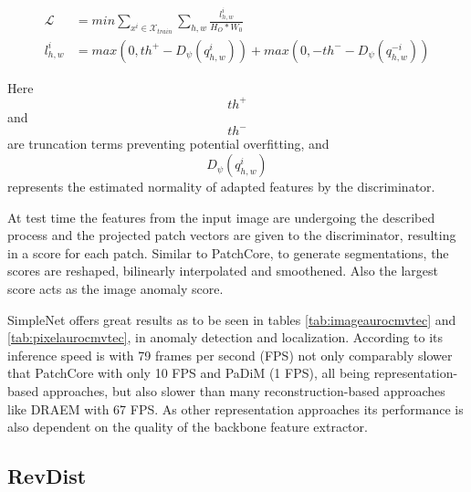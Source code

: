 \begin{equation}
    \label{eq:simplenetloss}
    \begin{split}
        \mathcal{L} &= min \sum_{x^{i}\in \mathcal{X}_{train}} \sum_{h, w} \frac{l^{i}_{h,w}}{H_{O} * W_{0}} \\
        l^{i}_{h,w} &= max(0, th^{+} - D_{\psi}(q^{i}_{h,w})) + max(0, -th^{-} - D_{\psi}(q^{-i}_{h,w}))
    \end{split}
\end{equation}    

Here $$th^{+}$$ and $$th^{-}$$ are truncation terms preventing potential overfitting, and $$D_{\psi}(q^{i}_{h,w})$$ represents the estimated normality of adapted features by the discriminator.

At test time the features from the input image are undergoing the described process and the projected patch vectors are given to the discriminator, resulting in a score for each patch. Similar to 
PatchCore, to generate segmentations, the scores are reshaped, bilinearly interpolated and smoothened. Also the largest score acts as the image anomaly score.

SimpleNet offers great results as to be seen in tables \ref{tab:imageaurocmvtec} and \ref{tab:pixelaurocmvtec}, in anomaly detection and localization. According to \cite{liu2023simplenet} its inference speed is with 79 frames per second (FPS) 
not only comparably slower that PatchCore \cite{patchCore2022} with only 10 FPS 
and PaDiM \cite{Defard_2021PADIM} (1 FPS), all being representation-based approaches, but also slower than many reconstruction-based approaches like DRAEM with 67 FPS. As other representation 
approaches its performance is also dependent on the quality of the backbone feature extractor.


\subsection{RevDist}
\label{subsec:revdist}

